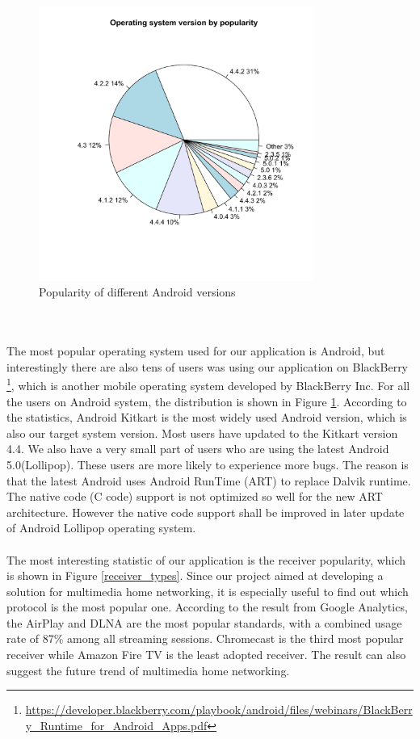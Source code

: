 \\
\begin{figure}[htb]
\centering \includegraphics[height=9cm]{charts/os_version_popularity}
\caption{Popularity of different Android versions \label{os_versions}}
\end{figure}\\
\\
The most popular operating system used for our application is Android, but interestingly there are also tens of users was using our application on BlackBerry \footnote{\url{https://developer.blackberry.com/playbook/android/files/webinars/BlackBerry_Runtime_for_Android_Apps.pdf}}, which is another mobile operating system developed by BlackBerry Inc.  For all the users on Android system, the distribution is shown in Figure \ref{os_versions}. According to the statistics, Android Kitkart is the most widely used Android version, which is also our target system version. Most users have updated to the Kitkart version 4.4. We also have a very small part of users who are using the latest Android 5.0(Lollipop). These users are more likely to experience more bugs. The reason is that the latest Android uses Android RunTime (ART) to replace Dalvik runtime\cite{dalvik_arch}. The native code (C code) support is not optimized so well for the new ART architecture. However the native code support shall be improved in later update of Android Lollipop operating system.\\
\\
The most interesting statistic of our application is the receiver popularity, which is shown in Figure \ref{receiver_types}. Since our project aimed at developing a solution for multimedia home networking, it is especially useful to find out which protocol is the most popular one. According to the result from Google Analytics, the AirPlay and DLNA are the most popular standards, with a combined   usage rate of 87\% among all streaming sessions. Chromecast is the third most popular receiver while Amazon Fire TV is the least adopted receiver. The result can also suggest the future trend of multimedia home networking.\\
